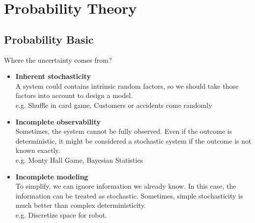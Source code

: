 \documentclass{bredelebeamer}
\begin{document}
\section{Probability Theory}
\subsection{Probability Basic}
\begin{frame}{Where the uncertainty comes from?}
  \begin{itemize}
    \item\begin{justify}
      \textbf{Inherent stochasticity}\\
      A system could contains intrinsic random factors, so we should take those
      factors into account to design a model.\\
      e.g. Shuffle in card game, Customers or accidents come randomly
    \end{justify}
    \item\begin{justify}
      \textbf{Incomplete observability}\\
      Sometimes, the system cannot be fully observed. Even if the outcome is
      deterministic, it might be considered a stochastic system if the outcome is
      not known exactly.\\
      e.g. Monty Hall Game, Bayesian Statistics
    \end{justify}
    \item\begin{justify}
      \textbf{Incomplete modeling}\\
      To simplify, we can ignore information we already know. In this case, the
      information can be treated as stochastic. Sometimes, simple stochasticity
      is much better than complex deterministicity.\\
      e.g. Discretize space for robot.
    \end{justify}
  \end{itemize}
\end{frame}
\end{document}
